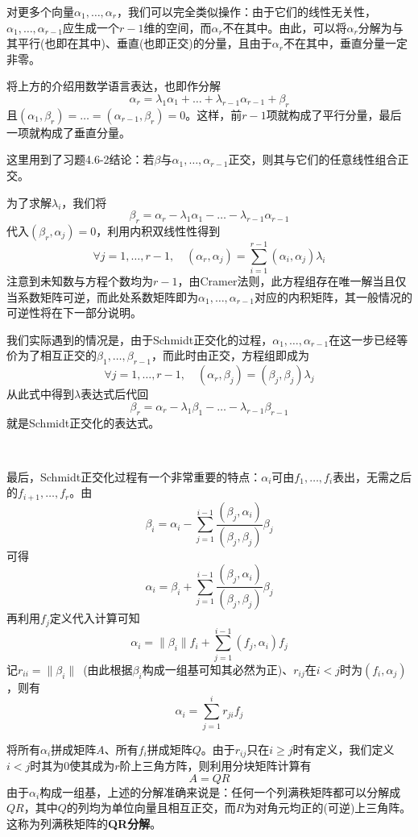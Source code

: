 \documentclass[a4paper,UTF8,fontset=windows]{ctexart}
\newcommand*{\note}{\noindent *}
\begin{document}
对更多个向量$\alpha_1,\dots,\alpha_r$，我们可以完全类似操作：由于它们的线性无关性，$\alpha_1,\dots,\alpha_{r-1}$应生成一个$r-1$维的空间，而$\alpha_r$不在其中。由此，可以将$\alpha_r$分解为与其平行(也即在其中)、垂直(也即正交)的分量，且由于$\alpha_r$不在其中，垂直分量一定非零。

将上方的介绍用数学语言表达，也即作分解
$$\alpha_r=\lambda_1\alpha_1+\dots+\lambda_{r-1}\alpha_{r-1}+\beta_r$$
且$(\alpha_1,\beta_r)=\dots=(\alpha_{r-1},\beta_r)=0$。这样，前$r-1$项就构成了平行分量，最后一项就构成了垂直分量。

\note 这里用到了习题4.6-2结论：若$\beta$与$\alpha_1,\dots,\alpha_{r-1}$正交，则其与它们的任意线性组合正交。

为了求解$\lambda_i$，我们将
$$\beta_r=\alpha_r-\lambda_1\alpha_1-\dots-\lambda_{r-1}\alpha_{r-1}$$
代入$(\beta_r,\alpha_j)=0$，利用内积双线性性得到
$$\forall j=1,\dots,r-1,\quad(\alpha_r,\alpha_j)=\sum_{i=1}^{r-1}(\alpha_i,\alpha_j)\lambda_i$$
注意到未知数与方程个数均为$r-1$，由Cramer法则，此方程组存在唯一解当且仅当系数矩阵可逆，而此处系数矩阵即为$\alpha_1,\dots,\alpha_{r-1}$对应的内积矩阵，其一般情况的可逆性将在下一部分说明。

我们实际遇到的情况是，由于Schmidt正交化的过程，$\alpha_1,\dots,\alpha_{r-1}$在这一步已经等价为了相互正交的$\beta_1,\dots,\beta_{r-1}$，而此时由正交，方程组即成为
$$\forall j=1,\dots,r-1,\quad(\alpha_r,\beta_j)=(\beta_j,\beta_j)\lambda_j$$
从此式中得到$\lambda$表达式后代回
$$\beta_r=\alpha_r-\lambda_1\beta_1-\dots-\lambda_{r-1}\beta_{r-1}$$
就是Schmidt正交化的表达式。

\

最后，Schmidt正交化过程有一个非常重要的特点：$\alpha_i$可由$f_1,\dots,f_i$表出，无需之后的$f_{i+1},\dots,f_r$。由
$$\beta_i=\alpha_i-\sum_{j=1}^{i-1}\frac{(\beta_j,\alpha_i)}{(\beta_j,\beta_j)}\beta_j$$
可得
$$\alpha_i=\beta_i+\sum_{j=1}^{i-1}\frac{(\beta_j,\alpha_i)}{(\beta_j,\beta_j)}\beta_j$$
再利用$f_j$定义代入计算可知
$$\alpha_i=\|\beta_i\|f_i+\sum_{j=1}^{i-1}(f_j,\alpha_i)f_j$$
记$r_{ii}=\|\beta_i\|$\ (由此根据$\beta_i$构成一组基可知其必然为正)、$r_{ij}$在$i<j$时为$(f_i,\alpha_j)$，则有
$$\alpha_i=\sum_{j=1}^ir_{ji}f_j$$

将所有$\alpha_i$拼成矩阵$A$、所有$f_i$拼成矩阵$Q$。由于$r_{ij}$只在$i\ge j$时有定义，我们定义$i<j$时其为0使其成为$r$阶上三角方阵，则利用分块矩阵计算有
$$A=QR$$
由于$\alpha_i$构成一组基，上述的分解准确来说是：任何一个列满秩矩阵都可以分解成$QR$，其中$Q$的列均为单位向量且相互正交，而$R$为对角元均正的(可逆)上三角阵。这称为列满秩矩阵的\textbf{QR分解}。
\end{document}

